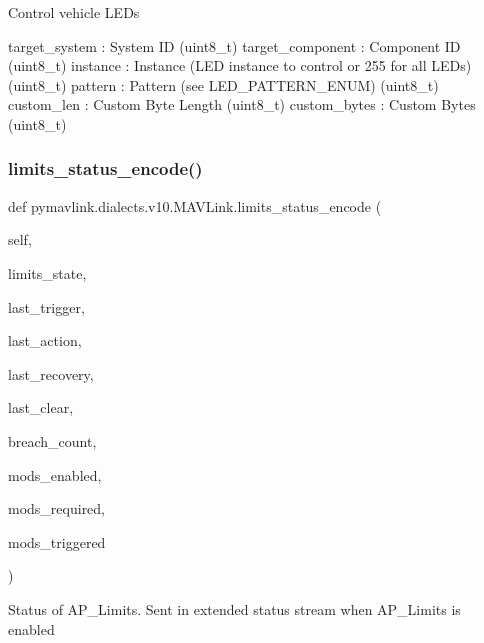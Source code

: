 \begin{DoxyVerb}
\begin{DoxyVerb}
\begin{DoxyVerb}
\begin{DoxyVerb}
\begin{DoxyVerb}Control vehicle LEDs

target_system             : System ID (uint8_t)
target_component          : Component ID (uint8_t)
instance                  : Instance (LED instance to control or 255 for all LEDs) (uint8_t)
pattern                   : Pattern (see LED_PATTERN_ENUM) (uint8_t)
custom_len                : Custom Byte Length (uint8_t)
custom_bytes              : Custom Bytes (uint8_t)\end{DoxyVerb}
 \mbox{\label{classpymavlink_1_1dialects_1_1v10_1_1MAVLink_ac21100b16bc5623f2986fb0dbe6b3160}} 
\subsubsection{\texorpdfstring{limits\+\_\+status\+\_\+encode()}{limits\_status\_encode()}}
{\footnotesize\ttfamily def pymavlink.\+dialects.\+v10.\+M\+A\+V\+Link.\+limits\+\_\+status\+\_\+encode (\begin{DoxyParamCaption}\item[{}]{self,  }\item[{}]{limits\+\_\+state,  }\item[{}]{last\+\_\+trigger,  }\item[{}]{last\+\_\+action,  }\item[{}]{last\+\_\+recovery,  }\item[{}]{last\+\_\+clear,  }\item[{}]{breach\+\_\+count,  }\item[{}]{mods\+\_\+enabled,  }\item[{}]{mods\+\_\+required,  }\item[{}]{mods\+\_\+triggered }\end{DoxyParamCaption})}

\begin{DoxyVerb}Status of AP_Limits. Sent in extended status stream when AP_Limits is
enabled


\end{DoxyVerb}
\end{DoxyVerb}
\end{DoxyVerb}
\end{DoxyVerb}
\end{DoxyVerb}
